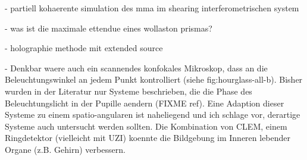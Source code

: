 \documentclass[oneside,a4paper,12pt,BCOR20mm,DIV14]{scrbook} %
\begin{document}
  - partiell kohaerente simulation des mma im shearing
    interferometrischen system

    - was ist die maximale ettendue eines wollaston prismas?

  - holographie methode mit extended source

  - Denkbar waere auch ein scannendes konfokales Mikroskop, dass an
    die Beleuchtungswinkel an jedem Punkt kontrolliert (siehe
    fig:hourglass-all-b).  Bisher wurden in der Literatur nur Systeme
    beschrieben, die die Phase des Beleuchtungslicht in der Pupille
    aendern (FIXME ref). Eine Adaption dieser Systeme zu einem
    spatio-angularen ist naheliegend und ich schlage vor, derartige
    Systeme auch untersucht werden sollten. Die Kombination von CLEM,
    einem Ringdetektor (vielleicht mit UZI) koennte die Bildgebung im
    Inneren lebender Organe (z.B. Gehirn) verbessern.


%


%
\end{document}
